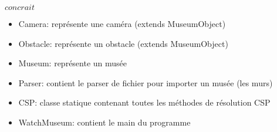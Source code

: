 $concrait$
\begin{itemize}
    \item Camera: représente une caméra (extends MuseumObject)
    \item Obstacle: représente un obstacle (extends MuseumObject)
    \item Museum: représente un musée
    \item Parser: contient le parser de fichier pour importer un musée (les murs)
    \item CSP: classe statique contenant toutes les méthodes de résolution CSP
    \item WatchMuseum: contient le main du programme
\end{itemize}